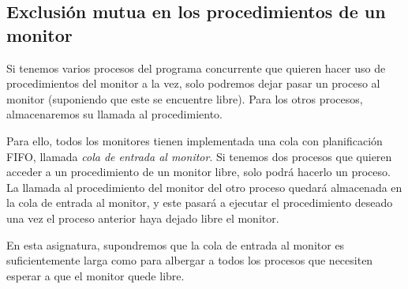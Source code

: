 \subsection{Exclusión mutua en los procedimientos de un monitor}
Si tenemos varios procesos del programa concurrente que quieren hacer uso de procedimientos del monitor a la vez, solo podremos dejar pasar un proceso al monitor (suponiendo que este se encuentre libre). Para los otros procesos, almacenaremos su llamada al procedimiento. 

Para ello, todos los monitores tienen implementada una cola con planificación FIFO, llamada \emph{cola de entrada al monitor}. Si tenemos dos procesos que quieren acceder a un procedimiento de un monitor libre, solo podrá hacerlo un proceso. La llamada al procedimiento del monitor del otro proceso quedará almacenada en la cola de entrada al monitor, y este pasará a ejecutar el procedimiento deseado una vez el proceso anterior haya dejado libre el monitor. 
\begin{observacion}
    En esta asignatura, supondremos que la cola de entrada al monitor es suficientemente larga como para albergar a todos los procesos que necesiten esperar a que el monitor quede libre.
\end{observacion}


